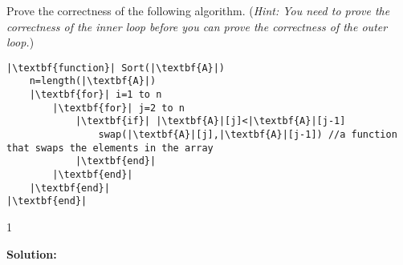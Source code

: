 \documentclass[9pt]{article}
\def\solutions{1}
\begin{document}
\fi
\newpage



\vspace{5mm}

\item 
Prove the correctness of the following algorithm. (\textit{Hint: You need to prove the correctness of the inner loop before you can prove the correctness of the outer loop.})

\begin{small}
\begin{lstlisting}
|\textbf{function}| Sort(|\textbf{A}|)
    n=length(|\textbf{A}|) 
    |\textbf{for}| i=1 to n
        |\textbf{for}| j=2 to n
            |\textbf{if}| |\textbf{A}|[j]<|\textbf{A}|[j-1]
                swap(|\textbf{A}|[j],|\textbf{A}|[j-1]) //a function that swaps the elements in the array
            |\textbf{end}|
        |\textbf{end}|
    |\textbf{end}|
|\textbf{end}|
\end{lstlisting}
\end{small}

\if\solutions1
\vspace{2mm}

\textbf{Solution:} \\


\fi

\newpage




\vspace{5mm}

\item
\end{document}
